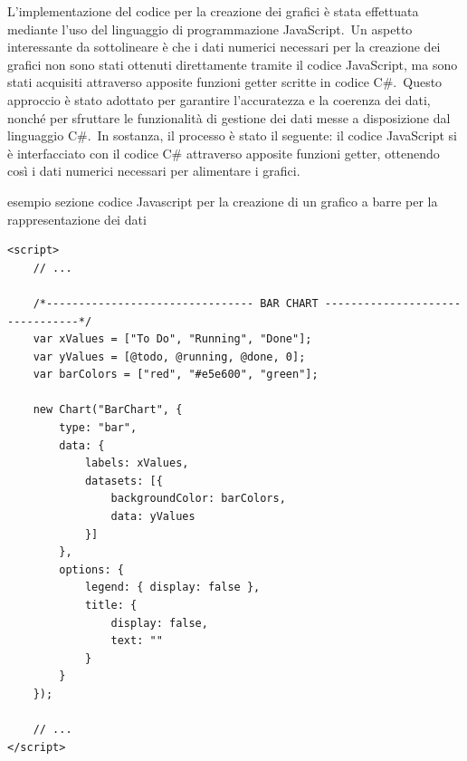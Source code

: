 L'implementazione del codice per la creazione dei grafici è stata effettuata mediante l'uso del linguaggio di programmazione JavaScript.\ 
Un aspetto interessante da sottolineare è che i dati numerici necessari per la creazione dei grafici non sono stati ottenuti direttamente 
tramite il codice JavaScript, ma sono stati acquisiti attraverso apposite funzioni getter scritte in codice C\#.\ 
Questo approccio è stato adottato per garantire l'accuratezza e la coerenza dei dati, nonché per sfruttare le funzionalità di gestione 
dei dati messe a disposizione dal linguaggio C\#.\
In sostanza, il processo è stato il seguente: il codice JavaScript si è interfacciato con il codice C\# attraverso apposite funzioni getter, 
ottenendo così i dati numerici necessari per alimentare i grafici.\
\begin{algorithm}[H]
 	\caption{esempio sezione codice Javascript per la creazione di un grafico a barre per la rappresentazione dei dati}
 	\label{lst:genic_mpi}
 	\begin{lstlisting}[label=JavaScript]
<script>
	// ...
	
	/*-------------------------------- BAR CHART --------------------------------*/
    var xValues = ["To Do", "Running", "Done"];
    var yValues = [@todo, @running, @done, 0];
    var barColors = ["red", "#e5e600", "green"];

    new Chart("BarChart", {
        type: "bar",
        data: {
            labels: xValues,
            datasets: [{
                backgroundColor: barColors,
                data: yValues
            }]
        },
        options: {
            legend: { display: false },
            title: {
                display: false,
                text: ""
            }
        }
    });

	// ...
</script>
 	\end{lstlisting}
\end{algorithm}
%
